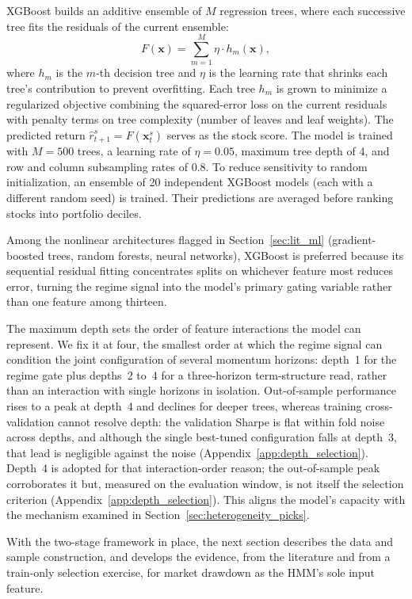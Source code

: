 XGBoost builds an additive ensemble of $M$ regression trees, where each successive tree fits the residuals of the current ensemble:
\begin{equation}
    F(\mathbf{x}) = \sum_{m=1}^{M} \eta \cdot h_m(\mathbf{x}),
\end{equation}
where $h_m$ is the $m$-th decision tree and $\eta$ is the learning rate that shrinks each tree's contribution to prevent overfitting. Each tree $h_m$ is grown to minimize a regularized objective combining the squared-error loss on the current residuals with penalty terms on tree complexity (number of leaves and leaf weights). The predicted return $\hat{r}_{t+1}^s = F(\mathbf{x}_t^s)$ serves as the stock score. The model is trained with $M = 500$ trees, a learning rate of $\eta = 0.05$, maximum tree depth of 4, and row and column subsampling rates of 0.8. To reduce sensitivity to random initialization, an ensemble of 20 independent XGBoost models (each with a different random seed) is trained. Their predictions are averaged before ranking stocks into portfolio deciles.

Among the nonlinear architectures flagged in Section~\ref{sec:lit_ml} (gradient-boosted trees, random forests, neural networks), XGBoost is preferred because its sequential residual fitting concentrates splits on whichever feature most reduces error, turning the regime signal into the model's primary gating variable rather than one feature among thirteen.

The maximum depth sets the order of feature interactions the model can represent. We fix it at four, the smallest order at which the regime signal can condition the joint configuration of several momentum horizons: depth~1 for the regime gate plus depths~2 to~4 for a three-horizon term-structure read, rather than an interaction with single horizons in isolation. Out-of-sample performance rises to a peak at depth~4 and declines for deeper trees, whereas training cross-validation cannot resolve depth: the validation Sharpe is flat within fold noise across depths, and although the single best-tuned configuration falls at depth~3, that lead is negligible against the noise (Appendix~\ref{app:depth_selection}). Depth~4 is adopted for that interaction-order reason; the out-of-sample peak corroborates it but, measured on the evaluation window, is not itself the selection criterion (Appendix~\ref{app:depth_selection}). This aligns the model's capacity with the mechanism examined in Section~\ref{sec:heterogeneity_picks}.\label{sec:depth_analysis}

With the two-stage framework in place, the next section describes the data and sample construction, and develops the evidence, from the literature and from a train-only selection exercise, for market drawdown as the HMM's sole input feature.
